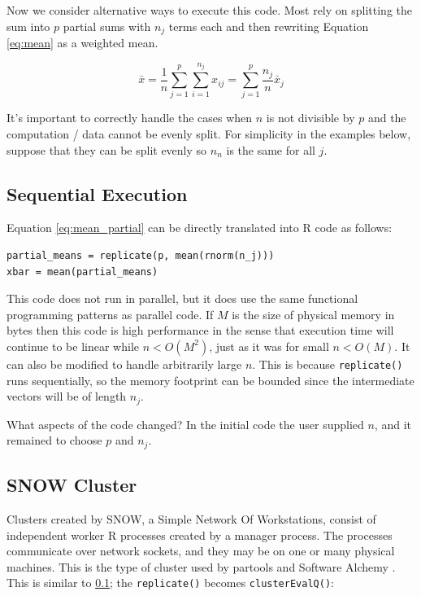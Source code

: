 \documentclass[12pt]{article}
\begin{document}
Now we consider alternative ways to execute this code.  Most rely on
splitting the sum into $p$ partial sums with $n_j$ terms each and then rewriting
Equation \ref{eq:mean} as a weighted mean.

\begin{equation}
    \bar{x} = \frac{1}{n} \sum_{j = 1}^p \sum_{i = 1}^{n_j} x_{ij}
    = \sum_{j = 1}^p \frac{n_j}{n} \bar{x}_j
\label{eq:mean_partial}
\end{equation}

It's important to correctly handle the cases when $n$ is not divisible by $p$
and the computation / data cannot be evenly split. For simplicity in the
examples below, suppose that they can be split evenly so $n_n$ is the same
for all $j$.

\subsection{Sequential Execution}
\label{section:sequential}

Equation \ref{eq:mean_partial} can be directly translated into R code as
follows:

\begin{verbatim}
partial_means = replicate(p, mean(rnorm(n_j)))
xbar = mean(partial_means)
\end{verbatim}

This code does not run in parallel, but it does use the same functional
programming patterns as parallel code. If $M$ is the size of physical memory in
bytes then this code is high performance in the sense
that execution time will continue to be linear while $n < O(M^2)$, just
as it was for small $n < O(M)$. It can also be modified to handle
arbitrarily large $n$. This is because \texttt{replicate()} runs
sequentially, so the memory footprint can be bounded since the intermediate
vectors will be of length $n_j$. 

What aspects of the code changed? In the initial code the user
supplied $n$, and it remained to choose $p$ and $n_j$.

\subsection{SNOW Cluster}

Clusters created by SNOW, a Simple Network Of Workstations,
consist of independent worker R processes created by a manager process. The
processes communicate over network sockets, and they may be on one or many
physical machines.  This is the type of cluster used by partools and
Software Alchemy \cite{R-partools} \cite{matloff2014software}.  This is
similar to \ref{section:sequential}; the \texttt{replicate()}
becomes \texttt{clusterEvalQ()}:
\end{document}
